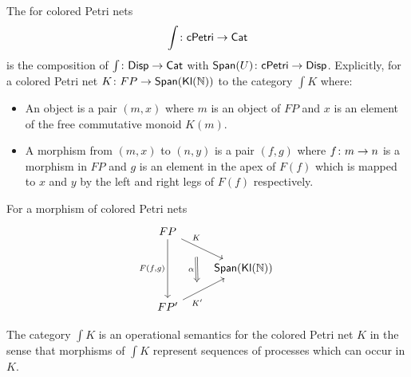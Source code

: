 \begin{defn}\label{semantics}
The  for colored Petri nets 
\[\int \colon \mathsf{cPetri} \to \mathsf{Cat} \]
is the composition of $\int \colon \mathsf{Disp} \to \mathsf{Cat}$ with $\mathsf{Span}(U) \colon \mathsf{cPetri} \to \mathsf{Disp}$.
Explicitly, for a colored Petri net $K \colon FP \to \mathsf{Span}(\mathsf{\mathsf{Kl}(\mathbb{N}) })$ to the category $\int K$ where:
\begin{itemize}
    \item An object is a pair $(m, x)$ where $m$ is an object of $FP$ and $x$ is an element of the free commutative monoid $K(m)$.
    \item A morphism from $(m,x)$ to $(n,y)$ is a pair $(f,g)$ where $f \colon m \to n$ is a morphism in $FP$ and $g$ is an element in the apex of $F(f)$ which is mapped to $x$ and $y$ by the left and right legs of $F(f)$ respectively.
\end{itemize}
For a morphism of colored Petri nets 
   \[
    \begin{tikzcd}
        FP 
        \ar[dd, "{F(f, g)}", swap] 
        \ar[dr, "K"{name=U}, pos=0.2]
        &\\&  
        \Span(\FCMon)
        \\
        FP'
        \ar[ur, "K'"{name=D}, swap, pos=0.15]
        & 
        \arrow[Rightarrow, from = U, to = D, shorten <=3ex, shorten >=3ex, "\alpha", swap]
    \end{tikzcd}
    \]
\end{defn}
\noindent The category $\int K$ is an operational semantics for the colored Petri net $K$ in the sense that morphisms of $\int K$ represent sequences of processes which can occur in $K$. 
